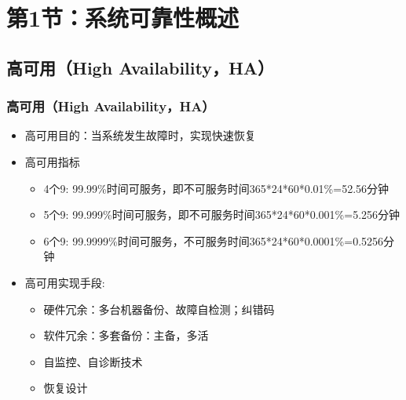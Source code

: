 \section{第1节：系统可靠性概述} %
\subsection{高可用（High Availability，HA）} %
\begin{frame}[fragile]
    \frametitle{高可用（High Availability，HA）}
\begin{itemize}
    \item 高可用目的：当系统发生故障时，实现快速恢复 \pause
    \item 高可用指标
\begin{itemize}
    \item 4个9: 99.99\%时间可服务，即不可服务时间365*24*60*0.01\%=52.56分钟
    \item 5个9: 99.999\%时间可服务，即不可服务时间365*24*60*0.001\%=5.256分钟
    \item 6个9: 99.9999\%时间可服务，不可服务时间365*24*60*0.0001\%=0.5256分钟
\end{itemize} \pause
    \item 高可用实现手段: 
 \begin{itemize}
    \item 硬件冗余：多台机器备份、故障自检测；纠错码
    \item 软件冗余：多套备份：主备，多活
    \item 自监控、自诊断技术
    \item 恢复设计
\end{itemize} 
\end{itemize}
\end{frame}



